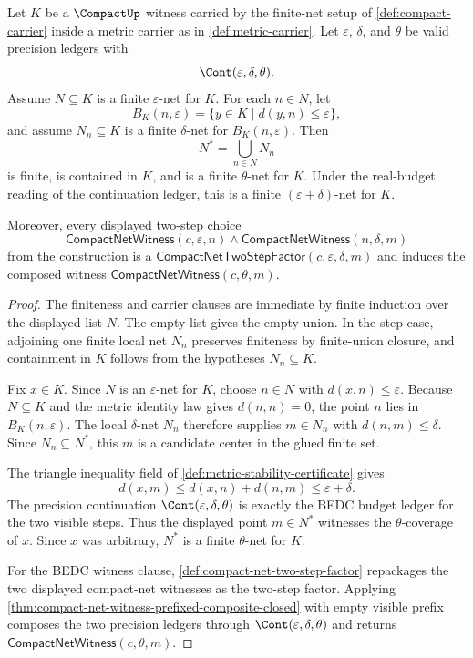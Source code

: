 \begin{theorem}
\label{thm:compact-two-step-finite-net-gluing}
Let $K$ be a $\CompactUp$ witness carried by the finite-net setup of \autoref{def:compact-carrier} inside a metric carrier as in \autoref{def:metric-carrier}. Let $\varepsilon$, $\delta$, and $\theta$ be valid precision ledgers with
$$
\Cont(\varepsilon,\delta,\theta).
$$
Assume $N\subseteq K$ is a finite $\varepsilon$-net for $K$. For each $n\in N$, let
$$
B_K(n,\varepsilon)=\{y\in K\mid d(y,n)\leq\varepsilon\},
$$
and assume $N_n\subseteq K$ is a finite $\delta$-net for $B_K(n,\varepsilon)$. Then
$$
N^\ast=\bigcup_{n\in N}N_n
$$
is finite, is contained in $K$, and is a finite $\theta$-net for $K$. Under the real-budget reading of the continuation ledger, this is a finite $(\varepsilon+\delta)$-net for $K$.

Moreover, every displayed two-step choice
$$
\mathsf{CompactNetWitness}(c,\varepsilon,n)\wedge
\mathsf{CompactNetWitness}(n,\delta,m)
$$
from the construction is a $\mathsf{CompactNetTwoStepFactor}(c,\varepsilon,\delta,m)$ and induces the composed witness $\mathsf{CompactNetWitness}(c,\theta,m)$.
\end{theorem}
\begin{proof}
The finiteness and carrier clauses are immediate by finite induction over the displayed list $N$. The empty list gives the empty union. In the step case, adjoining one finite local net $N_n$ preserves finiteness by finite-union closure, and containment in $K$ follows from the hypotheses $N_n\subseteq K$.

Fix $x\in K$. Since $N$ is an $\varepsilon$-net for $K$, choose $n\in N$ with $d(x,n)\leq\varepsilon$. Because $N\subseteq K$ and the metric identity law gives $d(n,n)=0$, the point $n$ lies in $B_K(n,\varepsilon)$. The local $\delta$-net $N_n$ therefore supplies $m\in N_n$ with $d(n,m)\leq\delta$. Since $N_n\subseteq N^\ast$, this $m$ is a candidate center in the glued finite set.

The triangle inequality field of \autoref{def:metric-stability-certificate} gives
$$
d(x,m)\leq d(x,n)+d(n,m)\leq\varepsilon+\delta.
$$
The precision continuation $\Cont(\varepsilon,\delta,\theta)$ is exactly the BEDC budget ledger for the two visible steps. Thus the displayed point $m\in N^\ast$ witnesses the $\theta$-coverage of $x$. Since $x$ was arbitrary, $N^\ast$ is a finite $\theta$-net for $K$.

For the BEDC witness clause, \autoref{def:compact-net-two-step-factor} repackages the two displayed compact-net witnesses as the two-step factor. Applying \autoref{thm:compact-net-witness-prefixed-composite-closed} with empty visible prefix composes the two precision ledgers through $\Cont(\varepsilon,\delta,\theta)$ and returns $\mathsf{CompactNetWitness}(c,\theta,m)$.
\end{proof}

